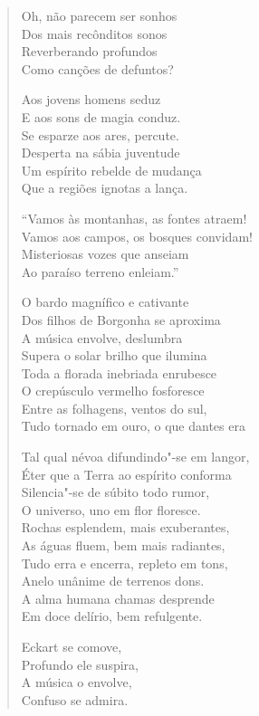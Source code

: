 \begin{verse}
Oh, não parecem ser sonhos\\
Dos mais recônditos sonos\\
Reverberando profundos\\
Como canções de defuntos?

Aos jovens homens seduz\\
E aos sons de magia conduz.\\
Se esparze aos ares, percute.\\
Desperta na sábia juventude\\
Um espírito rebelde de mudança\\
Que a regiões ignotas a lança.

``Vamos às montanhas, as fontes atraem!\\
Vamos aos campos, os bosques convidam!\\
Misteriosas vozes que anseiam\\
Ao paraíso terreno enleiam.''

O bardo magnífico e cativante\\
Dos filhos de Borgonha se aproxima\\
A música envolve, deslumbra\\
Supera o solar brilho que ilumina\\
Toda a florada inebriada enrubesce\\
O crepúsculo vermelho fosforesce\\
Entre as folhagens, ventos do sul,\\
Tudo tornado em ouro, o que dantes era 

Tal qual névoa difundindo"-se em langor,\\
Éter que a Terra ao espírito conforma\\
Silencia"-se de súbito todo rumor,\\
O universo, uno em flor floresce.\\
Rochas esplendem, mais exuberantes,\\
As águas fluem, bem mais radiantes,\\
Tudo erra e encerra, repleto em tons,\\
Anelo unânime de terrenos dons.\\
A alma humana chamas desprende\\
Em doce delírio, bem refulgente.

Eckart se comove,\\
Profundo ele suspira,\\
A música o envolve,\\
Confuso se admira.


\end{verse}
